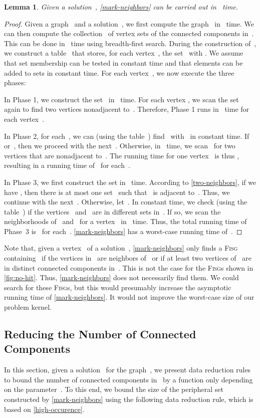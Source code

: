 \documentclass[12pt, a4paper, abstracton]{scrreprt}
\newcommand{\FISG}{\textsc{Fisg}}
\newcounter{theorem}
\newtheorem{lemma}{Lemma}[chapter]
\theoremstyle{definition}
\theoremstyle{remark}
\begin{document}
\begin{lemma}\label{mark-neighbors-time}
  Given a solution~, \autoref{mark-neighbors} can be carried out in ~time.
\end{lemma}

\begin{proof}
  Given a graph~ and a solution~, we first compute the graph~ in ~time. We can then compute the collection~ of vertex sets of the connected components in~. This can be done in ~time using breadth-first search. During the construction of~, we construct a table~ that stores, for each vertex~, the set~ with . We assume that set membership can be tested in constant time and that elements can be added to sets in constant time.  For each vertex~, we now execute the three phases:

  In Phase 1, we construct the set~ in ~time. For each vertex , we scan the set~ again to find two vertices nonadjacent to~. Therefore, Phase 1 runs in ~time for each vertex~.

  In Phase 2, for each~, we can (using the table~) find~ with~ in constant time. If~ or~, then we proceed with the next~. Otherwise, in ~time, we scan~ for two vertices that are nonadjacent to~. The running time for one vertex~ is thus , resulting in a running time of~ for each~.

  In Phase 3, we first construct the set  in ~time. According to \autoref{two-neighbors}, if we have , then there is at most one set~ such that~ is adjacent to~. Thus, we continue with the next~. Otherwise, let~. In constant time, we check (using the table~) if the vertices ~and~ are in different sets in~. If so, we scan the neighborhoods of~ and~ for a vertex~ in ~time. Thus, the total running time of Phase~3 is~ for each~. \autoref{mark-neighbors} has a worst-case running time of~.
\end{proof}

\noindent Note that, given a vertex~ of a solution~, \autoref{mark-neighbors} only finds a \FISG{}~ containing~ if the vertices in~ are neighbors of~ or if at least two vertices of~ are in distinct connected components in~. This is not the case for the \FISG{}s shown in \autoref{fig:no-hit}. Thus, \autoref{mark-neighbors} does not necessarily find them. We could search for these \FISG{}s, but this would presumably increase the asymptotic running time of \autoref{mark-neighbors}. It would not improve the worst-case size of our problem kernel.

\subsection{Reducing the Number of Connected
  Components}\label{unmarked-bounds}
In this section, given a solution~ for the graph~, we present data reduction rules to bound the number of connected components in~ by a function only depending on the parameter~. To this end, we bound the size of the peripheral set constructed by \autoref{mark-neighbors} using the following data reduction rule, which is based on \autoref{high-occurence}.
\end{document}
